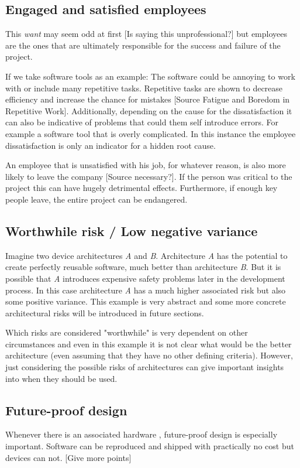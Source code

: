 \subsection{Engaged and satisfied employees}
This \textit{want} may seem odd at first [Is saying this unprofessional?] but employees are the ones that are ultimately responsible for the success and failure of the project.

If we take software tools as an example: The software could be annoying to work with or include many repetitive tasks. Repetitive tasks are shown to decrease efficiency and increase the chance for mistakes [Source Fatigue and Boredom in Repetitive Work]. Additionally, depending on the cause for the dissatisfaction it can also be indicative of problems that could them self introduce errors. For example a software tool that is overly complicated. In this instance the employee dissatisfaction is only an indicator for a hidden root cause.

An employee that is unsatisfied with his job, for whatever reason, is also more likely to leave the company [Source necessary?]. If the person was critical to the project this can have hugely detrimental effects. Furthermore, if enough key people leave, the entire project can be endangered. 
\subsection{Worthwhile risk / Low negative variance}
Imagine two device architectures \textit{A} and \textit{B}. Architecture \textit{A} has the potential to create perfectly reusable software, much better than architecture \textit{B}. But it is possible that \textit{A} introduces expensive safety problems later in the development process.
In this case architecture \textit{A} has a much higher associated risk but also  some positive variance. This example is very abstract and some more concrete architectural risks will be introduced in future sections. 

Which risks are considered "worthwhile" is very dependent on other circumstances and even in this example it is not clear what would be the better architecture (even assuming that they have no other defining criteria). However, just considering the possible risks of architectures can give important insights into when they should be used.

\subsection{Future-proof design}
Whenever there is an associated hardware , future-proof design is especially important. Software can be reproduced and shipped with practically no cost but devices can not. [Give more points]

